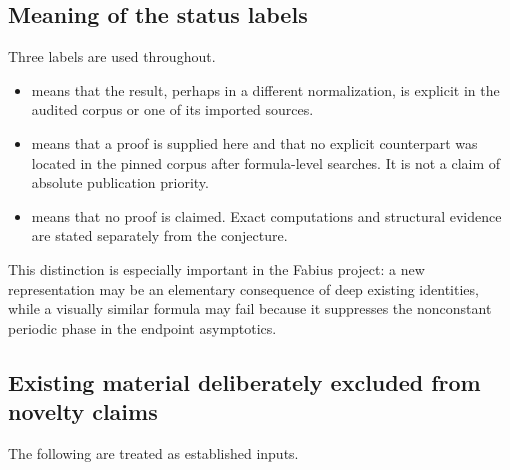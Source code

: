 \documentclass[11pt]{article}
\theoremstyle{definition}
\theoremstyle{remark}
\begin{document}
\subsection{Meaning of the status labels}

Three labels are used throughout.

\begin{itemize}
\item \baseline means that the result, perhaps in a different normalization,
      is explicit in the audited corpus or one of its imported sources.
\item \newresult means that a proof is supplied here and that no explicit
      counterpart was located in the pinned corpus after formula-level
      searches.  It is not a claim of absolute publication priority.
\item \conjstatus means that no proof is claimed.  Exact computations and
      structural evidence are stated separately from the conjecture.
\end{itemize}

This distinction is especially important in the Fabius project: a new
representation may be an elementary consequence of deep existing identities,
while a visually similar formula may fail because it suppresses the
nonconstant periodic phase in the endpoint asymptotics.

\subsection{Existing material deliberately excluded from novelty claims}

The following are treated as established inputs.
\end{document}

